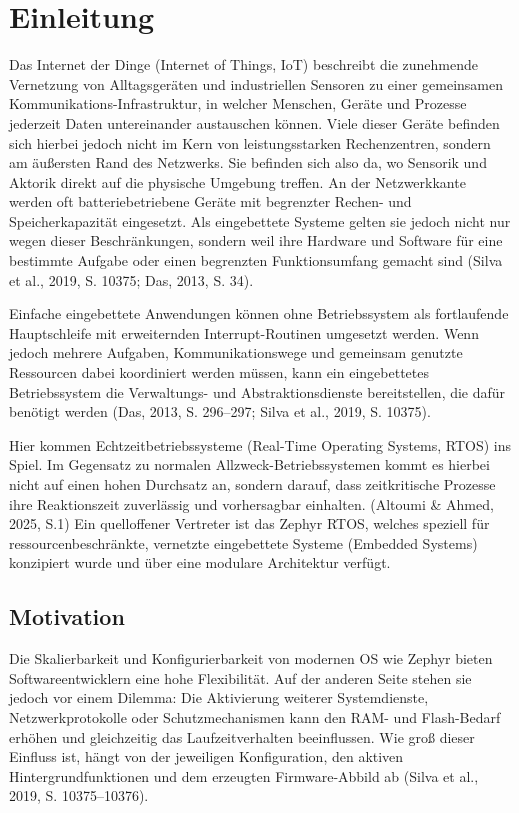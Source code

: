 \chapter{Einleitung}

Das Internet der Dinge (Internet of Things, IoT) beschreibt die zunehmende Vernetzung von Alltagsger{\"a}ten und industriellen Sensoren zu einer gemeinsamen Kommunikations-Infrastruktur, in welcher Menschen, Ger{\"a}te und Prozesse jederzeit Daten untereinander austauschen k{\"o}nnen. Viele dieser Ger{\"a}te befinden sich hierbei jedoch nicht im Kern von leistungsstarken Rechenzentren, sondern am {\"a}u{\ss}ersten Rand des Netzwerks. Sie befinden sich also da, wo Sensorik und Aktorik direkt auf die physische Umgebung treffen. An der Netzwerkkante werden oft batteriebetriebene Ger{\"a}te mit begrenzter Rechen- und Speicherkapazit{\"a}t eingesetzt. Als eingebettete Systeme gelten sie jedoch nicht nur wegen dieser Beschr{\"a}nkungen, sondern weil ihre Hardware und Software f{\"u}r eine bestimmte Aufgabe oder einen begrenzten Funktionsumfang gemacht sind (Silva et al., 2019, S. 10375; Das, 2013, S. 34).

Einfache eingebettete Anwendungen k{\"o}nnen ohne Betriebssystem als fortlaufende Hauptschleife mit erweiternden Interrupt-Routinen umgesetzt werden. Wenn jedoch mehrere Aufgaben, Kommunikationswege und gemeinsam genutzte Ressourcen dabei koordiniert werden m{\"u}ssen, kann ein eingebettetes Betriebssystem die Verwaltungs- und Abstraktionsdienste bereitstellen, die daf{\"u}r ben{\"o}tigt werden (Das, 2013, S. 296--297; Silva et al., 2019, S. 10375).

Hier kommen Echtzeitbetriebssysteme (Real-Time Operating Systems, RTOS) ins Spiel. Im Gegensatz zu normalen Allzweck-Betriebssystemen kommt es hierbei nicht auf einen hohen Durchsatz an, sondern darauf, dass zeitkritische Prozesse ihre Reaktionszeit zuverl{\"a}ssig und vorhersagbar einhalten. (Altoumi \& Ahmed, 2025, S.1) Ein quelloffener Vertreter ist das Zephyr RTOS, welches speziell f{\"u}r ressourcenbeschr{\"a}nkte, vernetzte eingebettete Systeme (Embedded Systems) konzipiert wurde und {\"u}ber eine modulare Architektur verf{\"u}gt.


\section{Motivation}
Die Skalierbarkeit und Konfigurierbarkeit von modernen OS wie Zephyr bieten Softwareentwicklern eine hohe Flexibilit{\"a}t. Auf der anderen Seite stehen sie jedoch vor einem Dilemma: Die Aktivierung weiterer Systemdienste, Netzwerkprotokolle oder Schutzmechanismen kann den RAM- und Flash-Bedarf erh{\"o}hen und gleichzeitig das Laufzeitverhalten beeinflussen. Wie gro{\ss} dieser Einfluss ist, h{\"a}ngt von der jeweiligen Konfiguration, den aktiven Hintergrundfunktionen und dem erzeugten Firmware-Abbild ab (Silva et al., 2019, S. 10375--10376).

